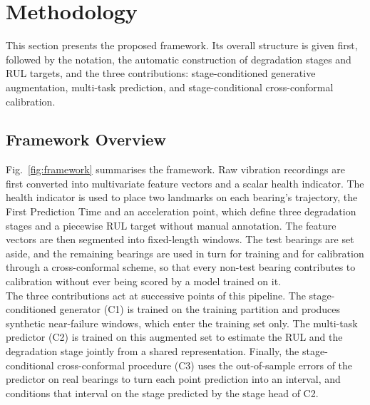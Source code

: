 %
%

\section{Methodology}
\label{sec:methodology}

This section presents the proposed framework. Its overall structure
is given first, followed by the notation, the automatic construction
of degradation stages and RUL targets, and the three contributions:
stage-conditioned generative augmentation, multi-task prediction, and
stage-conditional cross-conformal calibration.

\subsection{Framework Overview}
\label{sec:method_overview}

Fig.~\ref{fig:framework} summarises the framework. Raw vibration
recordings are first converted into multivariate feature vectors and
a scalar health indicator. The health indicator is used to place two
landmarks on each bearing's trajectory, the First Prediction Time and
an acceleration point, which define three degradation stages and a
piecewise RUL target without manual annotation. The feature vectors
are then segmented into fixed-length windows. The test bearings are
set aside, and the remaining bearings are used in turn for training
and for calibration through a cross-conformal scheme, so that every
non-test bearing contributes to calibration without ever being scored
by a model trained on it.\\

The three contributions act at successive points of this pipeline.
The stage-conditioned generator (C1) is trained on the training
partition and produces synthetic near-failure windows, which enter
the training set only. The multi-task predictor (C2) is trained on
this augmented set to estimate the RUL and the degradation stage
jointly from a shared representation. Finally, the stage-conditional
cross-conformal procedure (C3) uses the out-of-sample errors of the
predictor on real bearings to turn each point prediction into an
interval, and conditions that interval on the stage predicted by the
stage head of C2.\\

